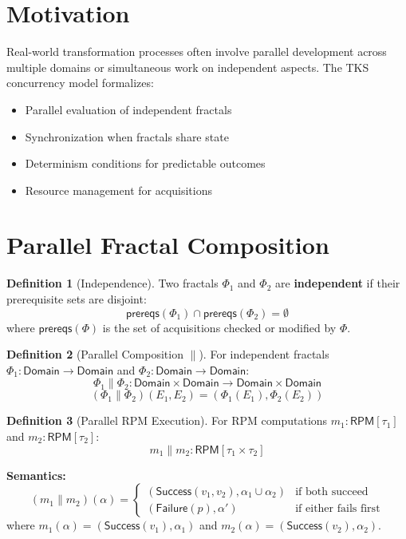 \documentclass[11pt,twoside,openright]{book}
\theoremstyle{definition}
\newtheorem{definition}{Definition}[chapter]
\theoremstyle{plain}
\theoremstyle{remark}
\newcommand{\Frac}{\Phi}
\newcommand{\pcomp}{\parallel}
\begin{document}
\section{Motivation}

Real-world transformation processes often involve parallel development across multiple domains or simultaneous work on independent aspects. The TKS concurrency model formalizes:
\begin{itemize}
  \item Parallel evaluation of independent fractals
  \item Synchronization when fractals share state
  \item Determinism conditions for predictable outcomes
  \item Resource management for acquisitions
\end{itemize}

\section{Parallel Fractal Composition}

\begin{definition}[Independence]
\label{def:independence}
Two fractals $\Frac_1$ and $\Frac_2$ are \textbf{independent} if their prerequisite sets are disjoint:
\[
\mathsf{prereqs}(\Frac_1) \cap \mathsf{prereqs}(\Frac_2) = \emptyset
\]
where $\mathsf{prereqs}(\Frac)$ is the set of acquisitions checked or modified by $\Frac$.
\end{definition}

\begin{definition}[Parallel Composition $\pcomp$]
\label{def:parallel-comp}
For independent fractals $\Frac_1 : \mathsf{Domain} \to \mathsf{Domain}$ and $\Frac_2 : \mathsf{Domain} \to \mathsf{Domain}$:
\[
\Frac_1 \pcomp \Frac_2 : \mathsf{Domain} \times \mathsf{Domain} \to \mathsf{Domain} \times \mathsf{Domain}
\]
\[
(\Frac_1 \pcomp \Frac_2)(E_1, E_2) = (\Frac_1(E_1), \Frac_2(E_2))
\]
\end{definition}

\begin{definition}[Parallel RPM Execution]
\label{def:parallel-rpm}
For RPM computations $m_1 : \mathsf{RPM}[\tau_1]$ and $m_2 : \mathsf{RPM}[\tau_2]$:
\[
m_1 \pcomp m_2 : \mathsf{RPM}[\tau_1 \times \tau_2]
\]

\textbf{Semantics:}
\[
(m_1 \pcomp m_2)(\alpha) =
\begin{cases}
(\mathsf{Success}(v_1, v_2), \alpha_1 \cup \alpha_2) & \text{if both succeed} \\
(\mathsf{Failure}(p), \alpha') & \text{if either fails first}
\end{cases}
\]
where $m_1(\alpha) = (\mathsf{Success}(v_1), \alpha_1)$ and $m_2(\alpha) = (\mathsf{Success}(v_2), \alpha_2)$.
\end{definition}
\end{document}
